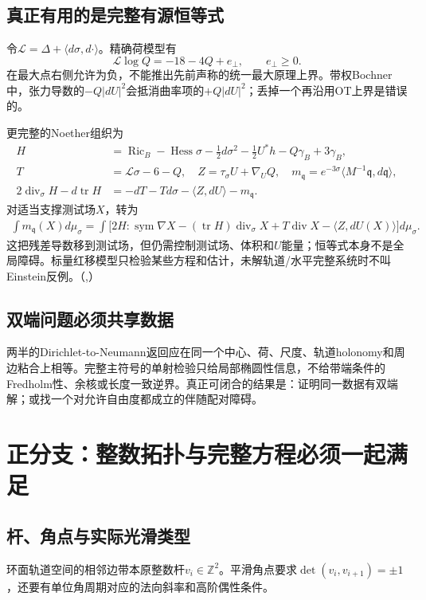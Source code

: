 \documentclass[UTF8,fontset=fandol,zihao=-4]{ctexart}
\theoremstyle{research}
\DeclareMathOperator{\Ric}{Ric}
\DeclareMathOperator{\tr}{tr}
\DeclareMathOperator{\diver}{div}
\DeclareMathOperator{\Hess}{Hess}
\newcommand{\Z}{\mathbb Z}
\numberwithin{equation}{section}
\begin{document}
\subsection{真正有用的是完整有源恒等式}
令$\mathcal L=\Delta+\langle d\sigma,d\cdot\rangle$。精确荷模型有
\[
\mathcal L\log Q=-18-4Q+e_\perp,\qquad e_\perp\ge0.
\]
在最大点右侧允许为负，不能推出先前声称的统一最大原理上界。带权Bochner中，张力导数的$-Q|dU|^2$会抵消曲率项的$+Q|dU|^2$；丢掉一个再沿用OT上界是错误的。

更完整的Noether组织为
\begin{align}
H&=\Ric_B-\Hess\sigma-\tfrac12d\sigma^2-\tfrac12U^*h-Q\gamma_B+3\gamma_B,\\
T&=\mathcal L\sigma-6-Q,\quad Z=\tau_\sigma U+\nabla_UQ,\quad
m_{\mathfrak q}=e^{-3\sigma}\langle M^{-1}\mathfrak q,d\mathfrak q\rangle,\\
2\diver_\sigma H-d\tr H&=-dT-Td\sigma-\langle Z,dU\rangle-m_{\mathfrak q}.
\end{align}
对适当支撑测试场$X$，转为
\begin{align}
\int m_{\mathfrak q}(X)d\mu_\sigma
=\int\bigl[2H:\operatorname{sym}\nabla X
-(\tr H)\diver_\sigma X
+T\diver X-\langle Z,dU(X)\rangle\bigr]d\mu_\sigma.
\end{align}
这把残差导数移到测试场，但仍需控制测试场、体积和$U$能量；恒等式本身不是全局障碍。标量红移模型只检验某些方程和估计，未解轨道/水平完整系统时不叫Einstein反例。\cite{G}（,）

\subsection{双端问题必须共享数据}
两半的Dirichlet-to-Neumann返回应在同一个中心、荷、尺度、轨道holonomy和周边粘合上相等。完整主符号的单射检验只给局部椭圆性信息，不给带端条件的Fredholm性、余核或长度一致逆界。真正可闭合的结果是：证明同一数据有双端解；或找一个对允许自由度都成立的伴随配对障碍。

\section{正分支：整数拓扑与完整方程必须一起满足}
\subsection{杆、角点与实际光滑类型}
环面轨道空间的相邻边带本原整数杆$v_i\in\Z^2$。平滑角点要求$\det(v_i,v_{i+1})=\pm1$，还要有单位角周期对应的法向斜率和高阶偶性条件。
\end{document}
